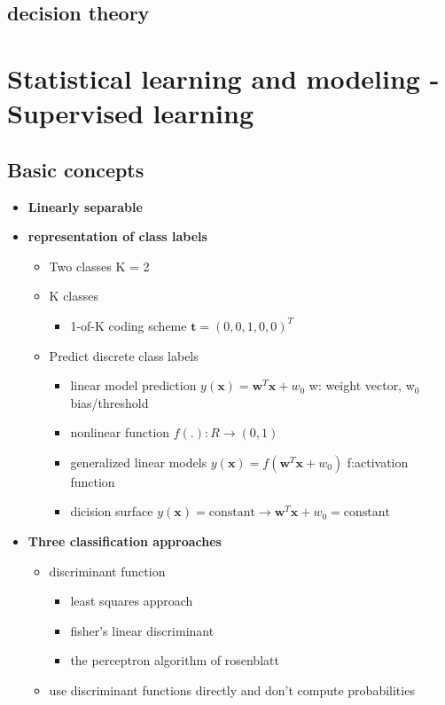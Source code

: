 \documentclass[11pt]{article}
\newcommand{\bl}[1] {\boldsymbol{#1}}
\begin{document}
\subsection{decision theory}
\label{sec:org3ead5e0}
\section{Statistical learning and modeling - Supervised learning}
\label{sec:orgff95c0f}
\subsection{Basic concepts}
\label{sec:org3477fc9}
\begin{itemize}
\item \textbf{Linearly separable}
\item \textbf{representation of class labels}
\begin{itemize}
\item Two classes K = 2
\item K classes
\begin{itemize}
\item 1-of-K coding scheme \(\bl{t}=(0,0,1,0,0)^T\)
\end{itemize}
\item Predict discrete class labels
\begin{itemize}
\item linear model prediction \(y(\bl{x})=\bl{w}^T\bl{x}+w_0\)
w: weight vector, w\(_{\text{0}}\) bias/threshold
\item nonlinear function \(f(.):R\to(0,1)\)
\item generalized linear models
\(y(\bl{x})=f(\bl{w}^T\bl{x}+w_0)\)
f:activation function
\item dicision surface
\(y(\bl{x})=\text{constant}\to \bl{w}^T\bl{x}+w_0=\text{constant}\)
\end{itemize}
\end{itemize}
\item \textbf{Three classification approaches}
\begin{itemize}
\item discriminant function
\begin{itemize}
\item least squares approach
\item fisher's linear discriminant
\item the perceptron algorithm of rosenblatt
\end{itemize}
\item use discriminant functions directly and don't compute probabilities
\end{itemize}
\end{itemize}
\end{document}
